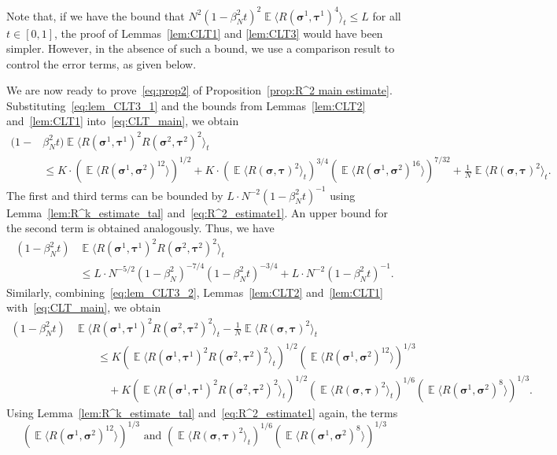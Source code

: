 \documentclass[letterpaper,11pt,reqno]{amsart}
\renewcommand{\leq}{\leqslant}
\newcommand{\ra}{\rangle}
\newcommand{\la}{\langle}
\newcommand{\mvgs}{\boldsymbol{\sigma}}\newcommand{\mvgS}{\boldsymbol{\Sigma}}\newcommand{\mvgt}{\boldsymbol{\tau}}
\DeclareMathOperator{\E}{\mathds{E}}
\begin{document}
Note that, if we have the bound that $N^2(1-\beta_N^2t)^2\E \la R(\mvgs^1, \mvgt^1)^4 \ra_{t} \leq L $ for all $t\in[0,1]$, the proof of Lemmas~\ref{lem:CLT1} and \ref{lem:CLT3} would have been simpler. However, in the absence of such a bound, we use a comparison result to control the error terms, as given below.

We are now ready to prove~\eqref{eq:prop2} of Proposition~\ref{prop:R^2 main estimate}. Substituting~\eqref{eq:lem_CLT3_1} and the bounds from Lemmas~\ref{lem:CLT2} and~\ref{lem:CLT1} into~\eqref{eq:CLT_main}, we obtain
\begin{align*}
    (1- &\beta_N^2 t) 
    \E \la R(\mvgs^1, \mvgt^1)^2 R(\mvgs^2, \mvgt^2)^2 \ra_{t}\\
    &\leq K \cdot \left( \E \la R(\mvgs^1, \mvgs^2)^{12} \ra \right)^{1/2} + K \cdot (\E \la R(\mvgs, \mvgt)^{2} \ra_t )^{3/4} (\E \la R(\mvgs^1, \mvgs^2)^{16} \ra )^{7/32} + \frac{1}{N} \E \la R(\mvgs, \mvgt)^2 \ra_{t}.
\end{align*}
The first and third terms can be bounded by \(L \cdot N^{-2}(1-\beta_N^2 t)^{-1}\) using Lemma~\ref{lem:R^k_estimate_tal} and~\eqref{eq:R^2_estimate1}. An upper bound for the second term is obtained analogously. Thus, we have 
\begin{align}
    (1- \beta_N^2 t) &
    \E \la R(\mvgs^1, \mvgt^1)^2 R(\mvgs^2, \mvgt^2)^2 \ra_{t} \nonumber \\
    &\leq L \cdot N^{-5/2} (1-\beta_N^2)^{-7/4}(1-\beta_N^2 t)^{-3/4} + L \cdot N^{-2}(1-\beta_N^2 t)^{-1}.\label{eq:CLT_est_1}
\end{align}
Similarly, combining~\eqref{eq:lem_CLT3_2}, Lemmas~\ref{lem:CLT2} and~\ref{lem:CLT1} with~\eqref{eq:CLT_main}, we obtain
\begin{align*}
    (1- \beta_N^2 t) &\E \la R(\mvgs^1, \mvgt^1)^2 R(\mvgs^2, \mvgt^2)^2 \ra_{t} - \frac{1}{N} \E \la R(\mvgs, \mvgt)^2 \ra_{t}  \\
    &\qquad\leq K \left(\E \la R(\mvgs^1, \mvgt^1)^2 R(\mvgs^2, \mvgt^2)^2  \ra_{t} \right)^{1/2}  (\E \la R(\mvgs^1, \mvgs^2)^{12} \ra )^{1/3} \\
    &\qquad\quad +  K (\E \la R(\mvgs^1, \mvgt^1)^{2} R(\mvgs^2, \mvgt^2)^2 \ra_t )^{1/2} (\E \la R(\mvgs, \mvgt)^{2} \ra_t )^{1/6} (\E \la R(\mvgs^1, \mvgs^2)^{8} \ra )^{1/3}.
\end{align*}
Using Lemma~\ref{lem:R^k_estimate_tal} and~\eqref{eq:R^2_estimate1} again, the terms 
$$
(\E \la R(\mvgs^1, \mvgs^2)^{12} \ra )^{1/3}\text{ and }
(\E \la R(\mvgs, \mvgt)^{2} \ra_t )^{1/6} (\E \la R(\mvgs^1, \mvgs^2)^{8} \ra )^{1/3}
$$
\end{document}
